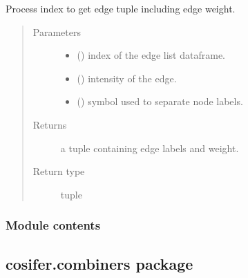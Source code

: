\documentclass[letterpaper,10pt,english]{sphinxmanual}
\begin{document}
\begin{fulllineitems}
\label{\detokenize{_modules/cosifer.collections:cosifer.collections.interaction_table.process_index_with_weights}}
Process index to get edge tuple including edge weight.
\begin{quote}\begin{description}
\item[{Parameters}] \leavevmode\begin{itemize}
\item {} 
 () \textendash{} index of the edge list dataframe.

\item {} 
 () \textendash{} intensity of the edge.

\item {} 
 () \textendash{} symbol used to separate node labels.

\end{itemize}

\item[{Returns}] \leavevmode
a tuple containing edge labels and weight.

\item[{Return type}] \leavevmode
tuple

\end{description}\end{quote}

\end{fulllineitems}



\subsubsection{Module contents}
\label{\detokenize{_modules/cosifer.collections:module-cosifer.collections}}\label{\detokenize{_modules/cosifer.collections:module-contents}}

\subsection{cosifer.combiners package}
\label{\detokenize{_modules/cosifer.combiners:cosifer-combiners-package}}\label{\detokenize{_modules/cosifer.combiners::doc}}
\end{document}
